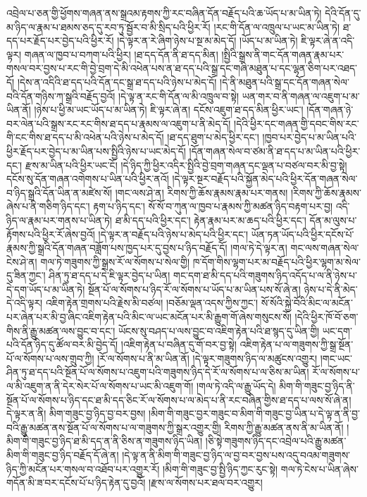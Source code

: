 འབྲེལ་པ་ཅན་གྱི་ཕྱོགས་གཞན་ནས་སྒྲའམ་རྟགས་ཀྱི་རང་བཞིན་དོན་བརྗོད་པའི་ཆ་ཡོད་པ་མ་ཡིན་ཏེ། དེའི་དོན་དུ་མ་ཉིད་ལ་རྣམ་པ་ཐམས་ཅད་དུ་རབ་ཏུ་སྦྱོར་བ་མི་སྲིད་པའི་ཕྱིར་རོ། །རང་གི་དོན་ལ་འཁྲུལ་པ་ཡང་མ་ཡིན་ཏེ། ཐ་དད་པར་རྗོད་པར་བྱེད་པའི་ཕྱིར་རོ། །དེ་ལྟར་ན་རེ་ཞིག་ཉེས་པ་སྔ་མ་མེད་དོ། །ཡོད་པ་མ་ཡིན་ཏེ། ཇི་ལྟར་ཞེ་ན་འདི་ལྟར། གཞན་ལ་ཁྱབ་པ་བཀག་པའི་ཕྱིར། །ཐ་དད་དོན་ནི་ཐ་དད་མིན། །སྤྱིའི་སྒྲས་ནི་གང་དོན་གཞན་རྣམ་པར་གསལ་བར་བྱས་པ་རང་གི་བྱེ་བྲག་དེ་མི་འཕེན་པས་ན་ཐ་དད་པའི་སྒྲ་དང་གཞི་མཐུན་པ་དང་ལྷན་ཅིག་པར་འཐད་དོ། །དེས་ན་འདིའི་ཐ་དད་པའི་དོན་དང་སྒྲ་ཐ་དད་པའི་ཉེས་པ་མེད་དོ། །དེ་ནི་མཐུན་པའི་སྒྲ་དང་དོན་གཞན་སེལ་བའི་དོན་གཉིས་ཀ་སྒྲའི་བརྗོད་བྱའོ། །དེ་ལྟ་ན་རང་གི་དོན་ལ་མི་འཁྲུལ་བ་སྟེ། ཡན་གར་བ་ནི་གཞན་ལ་འཇུག་པ་མ་ཡིན་ནོ། །ཉེས་པ་ཕྱི་མ་ཡང་ཡོད་པ་མ་ཡིན་ཏེ། ཇི་ལྟར་ཞེ་ན། དངོས་འཇུག་ཐ་དད་མིན་ཕྱིར་ཡང་། །དོན་གཞན་ཉེ་བར་ལེན་པའི་སྒྲས་རང་རང་གིས་ཐ་དད་པ་རྣམས་ལ་འཇུག་པ་ནི་མེད་དོ། །དེའི་ཕྱིར་དང་གཞན་གྱི་དབང་གིས་རང་གི་ངང་གིས་ཐ་དད་པ་མི་འཕེན་པའི་ཉེས་པ་མེད་དོ། །ཐ་དད་ཐུག་པ་མེད་ཕྱིར་དང་། །ཁྱབ་པར་བྱེད་པ་མ་ཡིན་པའི་ཕྱིར་རྗོད་པར་བྱེད་པ་མ་ཡིན་པས་སྤྱིའི་ཉེས་པ་ཡང་མེད་དོ། །དོན་གཞན་སེལ་བ་ཙམ་ནི་ཐ་དད་པ་མ་ཡིན་པའི་ཕྱིར་དང་། རྫས་མ་ཡིན་པའི་ཕྱིར་ཡང་ངོ། །དེ་ཉིད་ཀྱི་ཕྱིར་འདིར་སྤྱིའི་བྱེ་བྲག་གཞན་དང་ལྡན་པ་བཙལ་བར་མི་བྱ་སྟེ། དངོས་སུ་དོན་གཞན་འགེགས་པ་ཡིན་པའི་ཕྱིར་ནའོ། །དེ་ལྟར་སྔར་བརྗོད་པའི་སྐྱོན་མེད་པའི་ཕྱིར་དོན་གཞན་སེལ་བ་ཉིད་སྒྲའི་དོན་ཡིན་ན་མཛེས་སོ། །གང་ལས་ཤེ་ན། རིགས་ཀྱི་ཆོས་རྣམས་རྣམ་པར་གནས། །རིགས་ཀྱི་ཆོས་རྣམས་ཞེས་པ་ནི་གཅིག་ཉིད་དང་། རྟག་པ་ཉིད་དང་། སོ་སོ་བ་ཀུན་ལ་ཁྱབ་པ་རྣམས་ཀྱི་མཚན་ཉིད་བརྟག་པར་བྱ། འདི་ཉིད་ལ་རྣམ་པར་གནས་པ་ཡིན་ཏེ། ཐ་མི་དད་པའི་ཕྱིར་དང་། རྟེན་རྣམ་པར་མ་ཆད་པའི་ཕྱིར་དང་། དོན་མ་ལུས་པ་རྟོགས་པའི་ཕྱིར་རོ་ཞེས་བྱའོ། །དེ་ལྟར་ན་བརྗོད་པའི་ཉེས་པ་མེད་པའི་ཕྱིར་དང་། ཡོན་ཏན་ཡོད་པའི་ཕྱིར་དངོས་པོ་རྣམས་ཀྱི་སྒྲའི་དོན་གཞན་བཟློག་པས་ཁྱད་པར་དུ་བྱས་པ་ཉིད་བརྗོད་དོ། །གལ་ཏེ་དེ་ལྟར་ན། གང་ལས་གཞན་སེལ་ངེས་ཤེ་ན། གལ་ཏེ་གཟུགས་ཀྱི་སྒྲས་རོ་ལ་སོགས་པ་སེལ་གྱི། ཁ་དོག་གིས་ལྷག་པར་མ་བརྗོད་པའི་ཕྱིར་ལྷག་མ་སེལ་དུ་ཟིན་ཀྱང་། ཤིན་ཏུ་ཐ་དད་པ་དེ་ཇི་ལྟར་བྱེད་པ་ཡིན། གང་དག་ཐ་མི་དད་པའི་གཟུགས་ཉིད་འདོད་པ་ལ་ནི་ཉེས་པ་དེ་དག་ཡོད་པ་མ་ཡིན་ཏེ། སྔོན་པོ་ལ་སོགས་པ་ཉིད་རོ་ལ་སོགས་པ་ཡོད་པ་མ་ཡིན་པས་སོ་ཞེ་ན། ཉེས་པ་དེ་ནི་མེད་དེ་འདི་ལྟར། འཇིག་རྟེན་གྲགས་པའི་རྗེས་མི་བཙལ། །བཅོམ་ལྡན་འདས་ཀྱིས་ཀྱང་། སོ་སོའི་སྐྱེ་བོའི་མིང་ལ་མངོན་པར་ཞེན་པར་མི་བྱ་ཞིང་འཇིག་རྟེན་པའི་མིང་ལ་ཡང་མངོན་པར་མི་རྒྱུག་གོ་ཞེས་གསུངས་སོ། །དེའི་ཕྱིར་ཁོ་བོ་ཅག་གིས་ནི་རྒྱུ་མཚན་ལས་བྱུང་བ་དང་། ཡོངས་སུ་བཤད་པ་ལས་བྱུང་བ་འཇིག་རྟེན་པའི་ཐ་སྙད་དུ་ཡིན་གྱི། ཡང་དག་པའི་དོན་ཉིད་དུ་ཚོལ་བར་མི་བྱེད་དོ། །འཇིག་རྟེན་པ་བཞིན་དུ་གོ་བར་བྱ་སྟེ། འཇིག་རྟེན་པ་ལ་གཟུགས་ཀྱི་སྒྲ་སྔོན་པོ་ལ་སོགས་པ་ལས་གྲུབ་ཀྱི། །རོ་ལ་སོགས་པ་ནི་མ་ཡིན་ནོ། །དེ་ལྟར་གཟུགས་ཉིད་ལ་མཚུངས་འགྱུར། །གང་ཡང་ཤིན་ཏུ་ཐ་དད་པའི་སྔོན་པོ་ལ་སོགས་པ་འཇུག་པའི་གཟུགས་ཉིད་དེ་རོ་ལ་སོགས་པ་ལ་ཅིས་མ་ཡིན། རོ་ལ་སོགས་པ་ལ་མི་འཇུག་ན་ནི་དེར་སེར་པོ་ལ་སོགས་པ་ཡང་མི་འཇུག་གོ། །གལ་ཏེ་འདི་ལ་རྒྱུ་ཡོད་དེ། མིག་གི་གཟུང་བྱ་ཉིད་ནི་སྔོན་པོ་ལ་སོགས་པ་ཉིད་དང་ཐ་མི་དད་ཅིང་རོ་ལ་སོགས་པ་ལ་མེད་པ་ནི་རང་བཞིན་གྱིས་ཐ་དད་པ་ལས་སོ་ཞེ་ན། དེ་ལྟར་ན་ནི། མིག་གཟུང་བྱ་ཉིད་བྱ་བར་བྱས། །མིག་གི་གཟུང་བྱར་གཟུང་བ་མིག་གི་གཟུང་བྱ་ཡིན་པ་དེ་ལྟ་ན་ནི་བྱ་བའི་རྒྱུ་མཚན་ནས་སྔོན་པོ་ལ་སོགས་པ་ལ་གཟུགས་ཀྱི་སྒྲར་འགྱུར་གྱི། རིགས་ཀྱི་རྒྱུ་མཚན་ནས་ནི་མ་ཡིན་ནོ། །མིག་གི་གཟུང་བྱ་ཉིད་ཐ་མི་དད་ན་ནི་ཅིས་ན་གཟུགས་ཉིད་ཡིན། །ཅི་སྟེ་གཟུགས་ཉིད་དང་འབྲེལ་པའི་རྒྱུ་མཚན་མིག་གི་གཟུང་བྱ་ཉིད་བརྗོད་དོ་ཞེ་ན། །དེ་ལྟ་ན་ནི་མིག་གི་གཟུང་བྱ་ཉིད་ལ་བྱ་བར་བྱས་པས་འདུ་བའམ་གཟུགས་ཉིད་ཀྱི་མངོན་པར་གསལ་བ་འཐོབ་པར་འགྱུར་རོ། །མིག་གི་གཟུང་བྱ་སྤྱི་ཉིད་ཀྱང་རུང་སྟེ། གལ་ཏེ་ངེས་པ་ཡིན་ཞེས་གདོན་མི་ཟ་བར་དངོས་པོ་པ་ཉིད་རྟེན་དུ་བྱའོ། །རྫས་ལ་སོགས་པར་ཐལ་བར་འགྱུར། 
